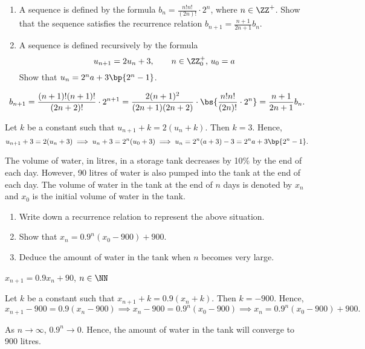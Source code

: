 \begin{problem}
    \begin{enumerate}
        \item A sequence is defined by the formula $b_n = \frac{n!n!}{(2n)!}\cdot2^n$, where $n \in \ZZ^+$. Show that the sequence satisfies the recurrence relation $b_{n+1} = \frac{n+1}{2n+1} b_n$.
        \item A sequence is defined recursively by the formula
        \[
            u_{n+1} = 2u_n + 3, \qquad n \in \ZZ_0^+, \, u_0 = a
        \]
        Show that $u_n = 2^na+3\bp{2^n - 1}$.
    \end{enumerate}
\end{problem}
\begin{solution}
    \begin{ppart}
        \[b_{n+1} = \frac{(n+1)! (n+1)!}{(2n+2)!}\cdot2^{n+1} = \frac{2(n+1)^2}{(2n+1)(2n+2)} \cdot \bs{\frac{n!n!}{(2n)!} \cdot 2^{n}} = \frac{n+1}{2n+1}b_n.\]
    \end{ppart}
    \begin{ppart}
        Let $k$ be a constant such that $u_{n+1} + k = 2(u_n + k)$. Then $k = 3$. Hence, \[u_{n+1} + 3 = 2(u_n + 3) \implies u_n +3 = 2^n(u_0 + 3) \implies u_n = 2^n (a + 3) - 3 = 2^n a + 3\bp{2^n - 1}.\]
    \end{ppart}
\end{solution}

\clearpage
\begin{problem}
    The volume of water, in litres, in a storage tank decreases by 10\% by the end of each day. However, 90 litres of water is also pumped into the tank at the end of each day. The volume of water in the tank at the end of $n$ days is denoted by $x_n$ and $x_0$ is the initial volume of water in the tank.

    \begin{enumerate}
        \item Write down a recurrence relation to represent the above situation.
        \item Show that $x_n = 0.9^n (x_0 - 900) + 900$.
        \item Deduce the amount of water in the tank when $n$ becomes very large.
    \end{enumerate}
\end{problem}
\begin{solution}
    \begin{ppart}
        $x_{n+1} = 0.9x_n + 90$, $n \in \NN$
    \end{ppart}
    \begin{ppart}
        Let $k$ be a constant such that $x_{n+1} + k = 0.9(x_n + k)$. Then $k = -900$. Hence, \[x_{n+1} - 900 = 0.9(x_n - 900) \implies x_n - 900 = 0.9^n (x_0 - 900) \implies x_n = 0.9^n (x_0 - 900) + 900.\]
    \end{ppart}
    \begin{ppart}
        As $n \to \infty$, $0.9^n \to 0$. Hence, the amount of water in the tank will converge to 900 litres.
    \end{ppart}
\end{solution}

